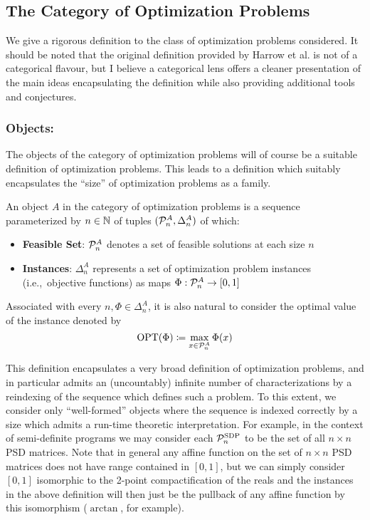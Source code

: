 \documentclass[runningheads,a4paper,english]{llncs}[2022/01/12]
\newcommand{\ie}{i.e.,\ }
\begin{document}
\subsection{The Category of Optimization Problems}
\label{sec:optimizationdef}
We give a rigorous definition to the class of optimization problems considered. 
It should be noted that the original definition provided by Harrow et al. is not of a categorical flavour, but I believe a categorical lens offers a cleaner presentation of the main ideas encapsulating the definition while also providing additional tools and conjectures.

\subsubsection{Objects:}
The objects of the category of optimization problems will of course be a suitable definition of optimization problems.
This leads to a definition which suitably encapsulates the ``size'' of optimization problems as a family.
\begin{definition}\label{def:optprob:obj}
  An object $A$ in the category of optimization problems is a sequence parameterized by $n \in \mathbb{N}$ of tuples $(\mathcal{P}_n^A, \Delta_n^A)$ of which:
  \begin{itemize}
    \item \textbf{Feasible Set}: $\mathcal{P}_n^A$ denotes a set of feasible solutions at each size $n$
    \item \textbf{Instances}: $\Delta_n^A$ represents a set of optimization problem instances (\ie objective functions) as maps $\Phi: \mathcal{P}_n^A \to [0,1]$
  \end{itemize}
  Associated with every $n, \Phi \in \Delta_n^A$, it is also natural to consider the optimal value of the instance denoted by
  \[\operatorname{OPT}(\Phi) \coloneq \max_{x\in \mathcal{P}_n^A} \Phi(x)\]
\end{definition}
This definition encapsulates a very broad definition of optimization problems, and in particular admits an (uncountably) infinite number of characterizations by a reindexing of the sequence which defines such a problem.
To this extent, we consider only ``well-formed'' objects where the sequence is indexed correctly by a size which admits a run-time theoretic interpretation.
For example, in the context of semi-definite programs we may consider each $\mathcal{P}_n^{\text{SDP}}$ to be the set of all $n\times n$ PSD matrices.
Note that in general any affine function on the set of $n\times n$ PSD matrices does not have range contained in $[0,1]$, but we can simply consider $[0,1]$ isomorphic to the 2-point compactification of the reals and the instances in the above definition will then just be the pullback of any affine function by this isomorphism ($\arctan$, for example).
\end{document}
